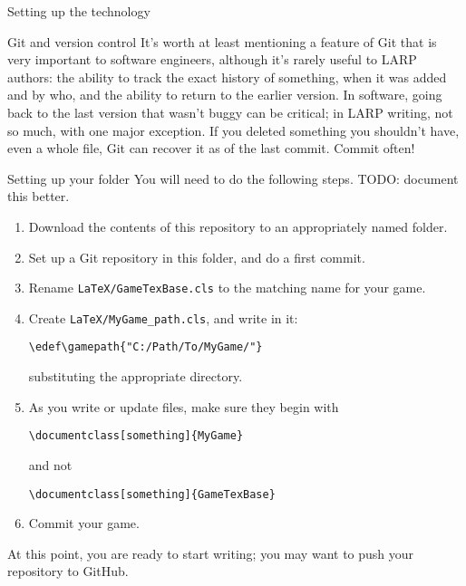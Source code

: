 \documentclass[sheet]{GameTexBase}
\begin{document}
\begin{section}{Setting up the technology}
\begin{subsection}{Git and version control}
It's worth at least mentioning a feature of Git that is very important to software engineers, although it's rarely useful to LARP authors: the ability to track the exact history of something, when it was added and by who, and the ability to return to the earlier version.  In software, going back to the last version that wasn't buggy can be critical; in LARP writing, not so much, with one major exception.  If you deleted something you shouldn't have, even a whole file, Git can recover it as of the last commit.  Commit often!
\end{subsection}
\begin{subsection}{Setting up your \gametex{} folder}
You will need to do the following steps.  TODO: document this better.
\begin{enumerate}
\item Download the contents of this repository to an appropriately named folder.
\item Set up a Git repository in this folder, and do a first commit.
\item Rename \lstinline|LaTeX/GameTexBase.cls| to the matching name for your game.
\item Create \lstinline|LaTeX/MyGame_path.cls|, and write in it:
\begin{verbatim}
\edef\gamepath{"C:/Path/To/MyGame/"}
\end{verbatim}
substituting the appropriate directory.
\item As you write or update files, make sure they begin with
\begin{verbatim}
\documentclass[something]{MyGame}
\end{verbatim}
and not
\begin{verbatim}
\documentclass[something]{GameTexBase}
\end{verbatim}
\item Commit your game.
\end{enumerate}
At this point, you are ready to start writing; you may want to push your repository to GitHub.
\end{subsection}
\end{section}
\end{document}
